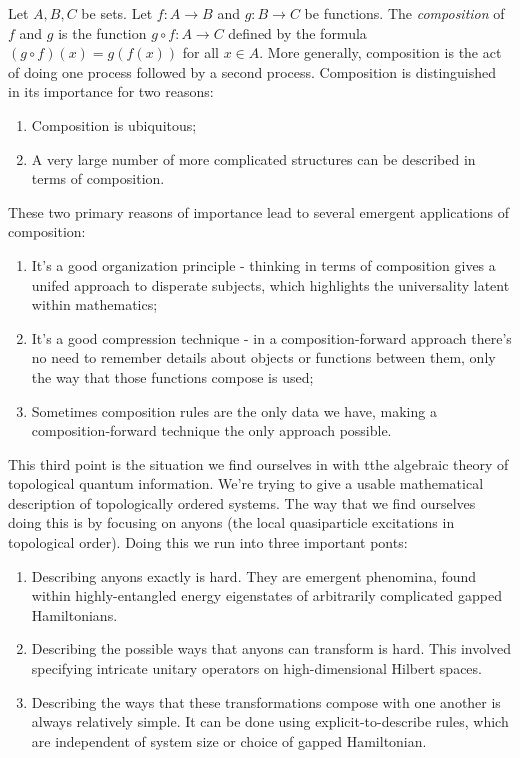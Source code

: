 \documentclass{article}
\theoremstyle{definition}
\newcommand{\0}{\left|0\right>}
\newcommand{\1}{\left|1\right>}
\numberwithin{figure}{section}
\begin{document}
Let $A,B,C$ be sets. Let $f:A\to B$ and $g:B\to C$ be functions. The \textit{composition} of $f$ and $g$ is the function $g\circ f: A\to C$ defined by the formula $(g\circ f)(x)=g(f(x))$ for all $x\in A$. More generally, composition is the act of doing one process followed by a second process. Composition is distinguished in its importance for two reasons:

\begin{enumerate}
\item Composition is ubiquitous;
\item A very large number of more complicated structures can be described in terms of composition.
\end{enumerate}

These two primary reasons of importance lead to several emergent applications of composition:

\begin{enumerate}
\item It's a good organization principle - thinking in terms of composition gives a unifed approach to disperate subjects, which highlights the universality latent within mathematics;
\item It's a good compression technique - in a composition-forward approach there's no need to remember details about objects or functions between them, only the way that those functions compose is used;
\item Sometimes composition rules are the only data we have, making a composition-forward technique the only approach possible.
\end{enumerate}

This third point is the situation we find ourselves in with tthe algebraic theory of topological quantum information. We're trying to give a usable mathematical description of topologically ordered systems. The way that we find ourselves doing this is by focusing on anyons (the local quasiparticle excitations in topological order). Doing this we run into three important ponts:

\begin{enumerate}
\item Describing anyons exactly is hard. They are emergent phenomina, found within highly-entangled energy eigenstates of arbitrarily complicated gapped Hamiltonians.
\item Describing the possible ways that anyons can transform is hard. This involved specifying intricate unitary operators on high-dimensional Hilbert spaces.
\item Describing the ways that these transformations compose with one another is always relatively simple. It can be done using explicit-to-describe rules, which are independent of system size or choice of gapped Hamiltonian.
\end{enumerate}
\end{document}
